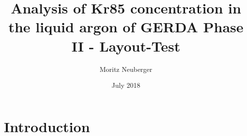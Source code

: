 \documentclass{article}
\title{Analysis of Kr85 concentration in the liquid argon of GERDA Phase II - Layout-Test}
\author{Moritz Neuberger}
\date{July 2018}
\begin{document}
\maketitle

\section{Introduction}
\end{document}

